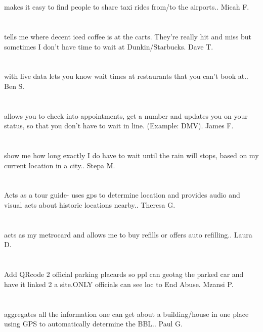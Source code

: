 \section{}makes it easy to find people to share taxi rides from/to the airports.. Micah F.
\section{}tells me where decent iced coffee is at the carts.  They're really hit and miss but sometimes I don't have time to wait at Dunkin/Starbucks. Dave T.
\section{}with live data lets you know wait times at restaurants that you can't book at.. Ben S.
\section{}allows you to check into appointments,  get a number and updates you on your status,  so that you don't have to wait in line. (Example: DMV). James F.
\section{}show me how long exactly I do have to wait until the rain will stops,  based on my current location in a city.. Stepa M.
\section{}Acts as a tour guide- uses gps to determine location and provides audio and visual acts about historic locations nearby.. Theresa G.
\section{}acts as my metrocard and allows me to buy refills or offers auto refilling.. Laura D.
\section{}Add QRcode 2 official parking placards so ppl can geotag the parked car and have it linked 2 a site.ONLY  officials can see loc to End Abuse. Mzansi P.
\section{}aggregates all the information one can get about a building/house in one place using GPS to automatically determine the BBL.. Paul G.
